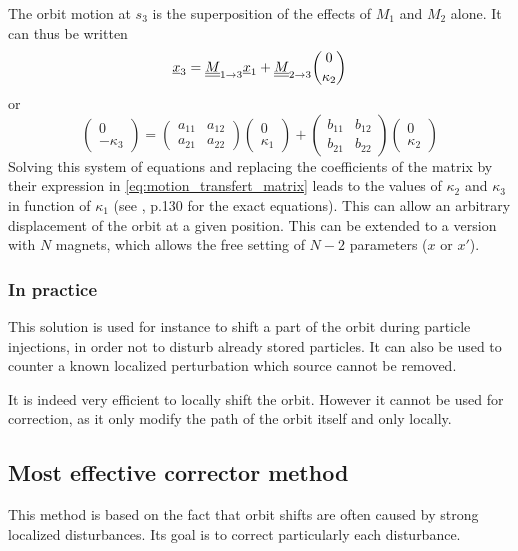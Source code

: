 The orbit motion at $s_3$ is the superposition of the effects of $M_1$ and $M_2$ alone. It can thus be written
\begin{equation}
\underline{x}_3 = \underline{\underline{M}}_{1 \rightarrow 3} \underline{x}_1 + \underline{\underline{M}}_{2 \rightarrow 3} \dbinom{0}{\kappa_2}
\end{equation}
or
\begin{equation*}
\begin{pmatrix} 0 \\ -\kappa_3 \end{pmatrix} =
\begin{pmatrix} a_{11} & a_{12} \\ a_{21} & a_{22} \end{pmatrix} \begin{pmatrix} 0 \\ \kappa_1 \end{pmatrix} +
\begin{pmatrix} b_{11} & b_{12} \\ b_{21} & b_{22} \end{pmatrix} \begin{pmatrix} 0 \\ \kappa_2 \end{pmatrix}
\end{equation*}
Solving this system of equations and replacing the coefficients of the matrix by their expression in \cref{eq:motion_transfert_matrix} leads to the values of $\kappa_2$ and $\kappa_3$ in function of $\kappa_1$ (see \cite{book:wille}, p.130 for the exact equations). This can allow an arbitrary displacement of the orbit at a given position. This can be extended to a version with $N$ magnets, which allows the free setting of $N-2$ parameters ($x$ or $x'$).

\subsubsection{In practice}
This solution is used for instance to shift a part of the orbit during particle injections, in order not to disturb already stored particles. It can also be used to counter a known localized perturbation which source cannot be removed.

It is indeed very efficient to locally shift the orbit. However it cannot be used for correction, as it only modify the path of the orbit itself and only locally.

\subsection{Most effective corrector method}
\label{sec:most_effective_corr}
This method is based on the fact that orbit shifts are often caused by strong localized disturbances. Its goal is to correct particularly each disturbance.

